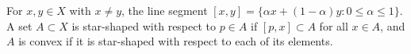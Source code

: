 For $x,y \in X$ with $x \neq y$, the line segment $[x,y] = \{\alpha x + (1-\alpha)y : 0 \leqslant \alpha \leqslant 1\}$. A set $A \subset X$ is star-shaped with respect to $p \in A$ if $[p,x] \subset A$ for all $x \in A$, and $A$ is convex if it is star-shaped with respect to each of its elements.